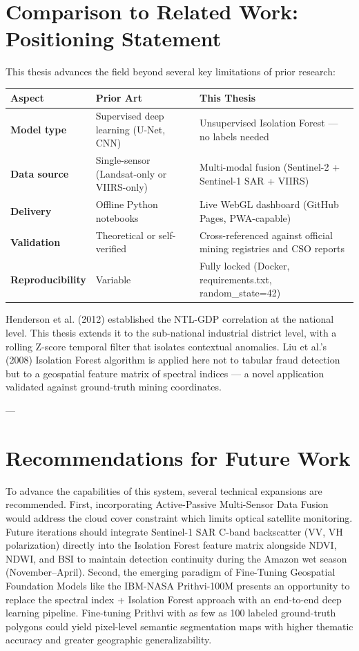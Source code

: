 \section{Comparison to Related Work: Positioning Statement}
This thesis advances the field beyond several key limitations of prior research:

\begin{table}[h]
\centering
\begin{tabular}{lll}
\toprule
Aspect & Prior Art & This Thesis \\
\midrule
\textbf{Model type} & Supervised deep learning (U-Net, CNN) & Unsupervised Isolation Forest — no labels needed \\
\textbf{Data source} & Single-sensor (Landsat-only or VIIRS-only) & Multi-modal fusion (Sentinel-2 + Sentinel-1 SAR + VIIRS) \\
\textbf{Delivery} & Offline Python notebooks & Live WebGL dashboard (GitHub Pages, PWA-capable) \\
\textbf{Validation} & Theoretical or self-verified & Cross-referenced against official mining registries and CSO reports \\
\textbf{Reproducibility} & Variable & Fully locked (Docker, requirements.txt, random\_state=42) \\
\bottomrule
\end{tabular}
\end{table}
Henderson et al. (2012) established the NTL-GDP correlation at the national level. This thesis extends it to the sub-national industrial district level, with a rolling Z-score temporal filter that isolates contextual anomalies. Liu et al.'s (2008) Isolation Forest algorithm is applied here not to tabular fraud detection but to a geospatial feature matrix of spectral indices — a novel application validated against ground-truth mining coordinates.

---

\section{Recommendations for Future Work}
To advance the capabilities of this system, several technical expansions are recommended. First, incorporating Active-Passive Multi-Sensor Data Fusion would address the cloud cover constraint which limits optical satellite monitoring. Future iterations should integrate Sentinel-1 SAR C-band backscatter (VV, VH polarization) directly into the Isolation Forest feature matrix alongside NDVI, NDWI, and BSI to maintain detection continuity during the Amazon wet season (November–April). Second, the emerging paradigm of Fine-Tuning Geospatial Foundation Models like the IBM-NASA Prithvi-100M presents an opportunity to replace the spectral index + Isolation Forest approach with an end-to-end deep learning pipeline. Fine-tuning Prithvi with as few as 100 labeled ground-truth polygons could yield pixel-level semantic segmentation maps with higher thematic accuracy and greater geographic generalizability.

